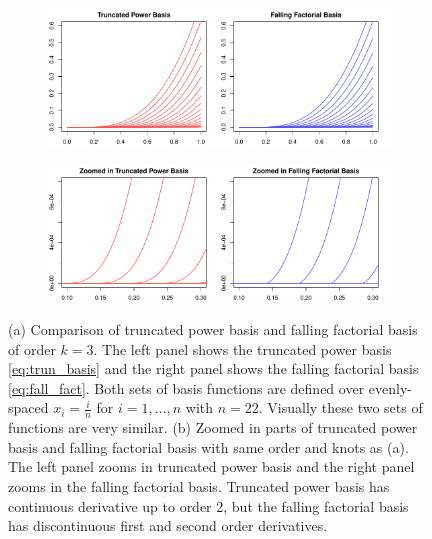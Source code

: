 \documentclass[a4paper]{article}
\begin{document}
\begin{figure}[t!]
\centering
   \begin{subfigure}[b]{1\textwidth}
   \includegraphics[width=1\linewidth]{Figures/Figure8.pdf}
   \caption{}
\end{subfigure}

\begin{subfigure}[b]{1\textwidth}
   \includegraphics[width=1\linewidth]{Figures/Figure8b.pdf}
   \caption{}
\end{subfigure}

\caption[Two numerical solutions]{(a) Comparison of truncated power basis and falling factorial basis of order $k=3$. The left panel shows the truncated power basis \eqref{eq:trun_basis} and the right panel shows the falling factorial basis \eqref{eq:fall_fact}. Both sets of basis functions are defined over evenly-spaced $x_i = \frac{i}{n}$ for $i=1,\ldots, n$ with $n = 22$. Visually these two sets of functions are very similar. (b) Zoomed in parts of truncated power basis and falling factorial basis with same order and knots as (a). The left panel zooms in truncated power basis and the right panel zooms in the falling factorial basis. Truncated power basis has continuous derivative up to order 2, but the falling factorial basis has discontinuous first and second order derivatives.}
\label{fig:Figure8_fall}
\end{figure}


\end{document}
